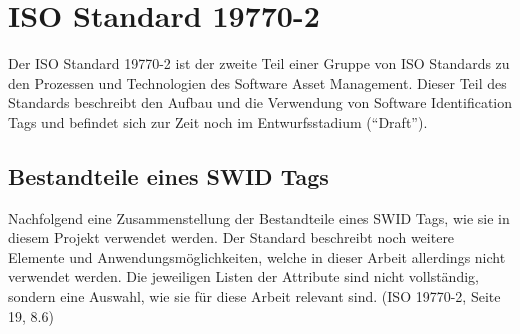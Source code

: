 \section{ISO Standard 19770-2}
\label{analyse:swidstandard} 
Der ISO Standard 19770-2\cite{iso19770-2} ist der zweite Teil einer Gruppe von ISO Standards
zu den Prozessen und Technologien des Software Asset Management. Dieser Teil des
Standards beschreibt den Aufbau und die Verwendung von Software Identification
Tags und befindet sich zur Zeit noch im Entwurfsstadium (\enquote{Draft}).

\subsection{Bestandteile eines SWID Tags}
Nachfolgend eine Zusammenstellung der Bestandteile eines SWID Tags, wie sie in
diesem Projekt verwendet werden. Der Standard beschreibt noch weitere Elemente
und Anwendungsmöglichkeiten, welche in dieser Arbeit allerdings nicht verwendet
werden. Die jeweiligen Listen der Attribute sind nicht vollständig, sondern eine
Auswahl, wie sie für diese Arbeit relevant sind. (ISO
19770-2\cite{iso19770-2}, Seite 19, 8.6)

